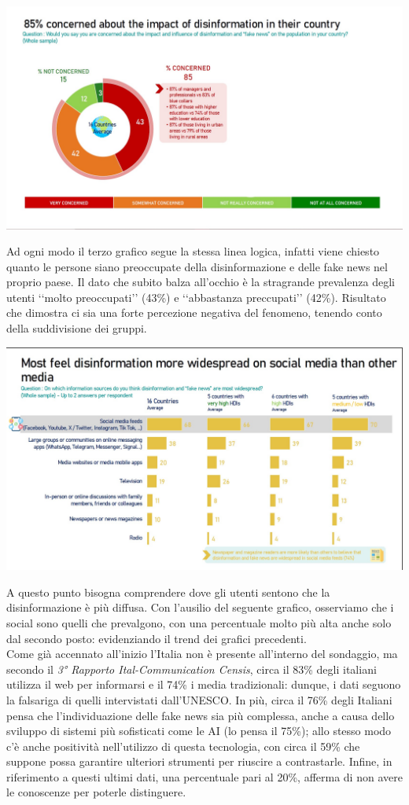 \documentclass{article}
\begin{document}
\begin{justify}
\begin{center}
\includegraphics[width=0.6\linewidth]{Immagini/Grafico3.jpg}
\end{center}
    Ad ogni modo il terzo grafico segue la stessa linea logica, infatti viene chiesto quanto le persone siano preoccupate della disinformazione e delle fake news nel proprio paese.
    Il dato che subito balza all'occhio è la stragrande prevalenza degli utenti ‘‘molto preoccupati’’ (43\%) e ‘‘abbastanza preccupati’’ (42\%). Risultato che dimostra ci sia una forte percezione negativa del fenomeno, tenendo conto della suddivisione dei gruppi.

\begin{center}
\includegraphics[width=0.6\linewidth]{Immagini/Grafico4.jpg}
\end{center}
    A questo punto bisogna comprendere dove gli utenti sentono che la disinformazione è più diffusa. Con l'ausilio del seguente grafico, osserviamo che i social sono quelli che prevalgono, con una percentuale molto più alta anche solo dal secondo posto: evidenziando il trend dei grafici precedenti.\\
    Come già accennato all'inizio l'Italia non è presente all'interno del sondaggio, ma secondo il \textit{3° Rapporto Ital-Communication Censis}, circa il 83\% degli italiani utilizza il web per informarsi e il 74\% i media tradizionali: dunque, i dati seguono la falsariga di quelli intervistati dall'UNESCO.
    In più, circa il 76\% degli Italiani pensa che l'individuazione delle fake news sia più complessa, anche a causa dello sviluppo di sistemi più sofisticati come le AI (lo pensa il 75\%); allo stesso modo c'è anche positività nell'utilizzo di questa tecnologia, con circa il 59\% che suppone possa garantire ulteriori strumenti per riuscire a contrastarle.
    Infine, in riferimento a questi ultimi dati, una percentuale pari al 20\%, afferma di non avere le conoscenze per poterle distinguere.\citep{chiariello_disinformazione_2023}
\end{justify}
\end{document}
